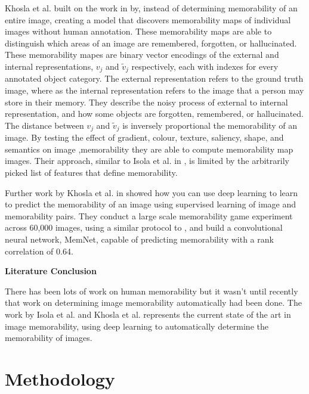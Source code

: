 \documentclass{UoYCSproject}
\begin{document}
Khosla et al. \cite{NIPS12_Khosla} built on the work in \cite{Isola2011, IsolaParikhTorralbaOliva2011} by, instead of determining memorability of an entire image, creating a model that discovers memorability maps of individual images without human annotation. These memorability maps are able to distinguish which areas of an image are remembered, forgotten, or hallucinated. These memorability mapes are binary vector encodings of the external and internal representations, $v_j$ and $\tilde{v}_j$ respectively, each with indexes for every annotated object category. The external representation refers to the ground truth image, where as the internal representation refers to the image that a person may store in their memory. They describe the noisy process of external to internal representation, and how some objects are forgotten, remembered, or hallucinated. The distance between $v_j$ and $\tilde{v}_j$ is inversely proportional the memorability of an image. By testing the effect of gradient, colour, texture, saliency, shape, and semantics on image ,memorability they are able to compute memorability map images. Their approach, similar to Isola et al. in \cite{Isola2011, IsolaParikhTorralbaOliva2011}, is limited by the arbitrarily picked list of features that define memorability.  

Further work by Khosla et al. in \cite{ICCV15_Khosla} showed how you can use deep learning to learn to predict the memorability of an image using supervised learning of image and memorability pairs. They conduct a large scale memorability game experiment across 60,000 images, using a similar protocol to \cite{isola2014memorability}, and build a convolutional neural network, MemNet, capable of predicting memorability with a rank correlation of 0.64.  

\textbf{Literature Conclusion}

There has been lots of work on human memorability but it wasn't until recently that work on determining image memorability automatically had been done. The work by Isola et al. \cite{Isola2011,IsolaParikhTorralbaOliva2011} and Khosla et al. \cite{ICCV15_Khosla} represents the current state of the art in image memorability, using deep learning to automatically determine the memorability of images.

\chapter{Methodology}

\end{document}
